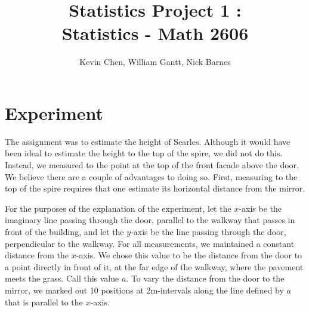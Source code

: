 \documentclass[11pt]{article}
\title{Statistics Project 1 : \\ Statistics - Math 2606}
\author{Kevin Chen, William Gantt, Nick Barnes}
\date{}
\begin{document}
\maketitle
\section{Experiment}
The assignment was to estimate the height of Searles. Although it would have been ideal to estimate the height to the top of the spire, we did not do this. Instead, we measured to the point at the top of the front facade above the door. We believe there are a couple of advantages to doing so. First, measuring to the top of the spire requires that one estimate its horizontal distance from the mirror. 

For the purposes of the explanation of the experiment, let the $x$-axis be the imaginary line passing through the door, parallel to the walkway that passes in front of the building, and let the $y$-axis be the line passing through the door, perpendicular to the walkway. For all measurements, we maintained a constant distance from the $x$-axis. We chose this value to be the distance from the door to a point directly in front of it, at the far edge of the walkway, where the pavement meets the grass. Call this value $a$. To vary the distance from the door to the mirror, we marked out 10 positions at 2m-intervals along the line defined by $a$ that is parallel to the $x$-axis.
\end{document}
